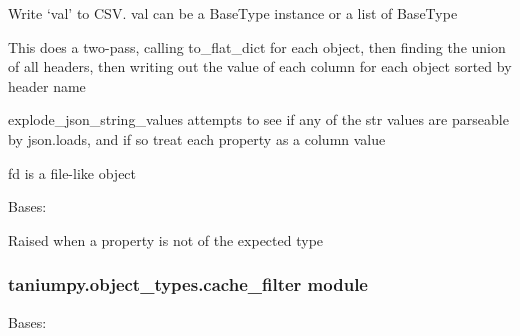 \documentclass[letterpaper,10pt,english]{sphinxmanual}
\begin{document}
\begin{fulllineitems}

\begin{fulllineitems}
\label{taniumpy.object_types:taniumpy.object_types.base.BaseType.write_csv}
Write `val' to CSV. val can be a BaseType instance or a list of
BaseType

This does a two-pass, calling to\_flat\_dict for each object, then
finding the union of all headers,
then writing out the value of each column for each object
sorted by header name

explode\_json\_string\_values attempts to see if any of the str values
are parseable by json.loads, and if so treat each property as a column
value

fd is a file-like object

\end{fulllineitems}


\end{fulllineitems}


\begin{fulllineitems}
\label{taniumpy.object_types:taniumpy.object_types.base.IncorrectTypeException}
Bases: \href{http://docs.python.org/2.7/library/exceptions.html\#exceptions.Exception}{}

Raised when a property is not of the expected type

\end{fulllineitems}



\subsubsection{taniumpy.object\_types.cache\_filter module}
\label{taniumpy.object_types:taniumpy-object-types-cache-filter-module}\label{taniumpy.object_types:module-taniumpy.object_types.cache_filter}

\begin{fulllineitems}
\label{taniumpy.object_types:taniumpy.object_types.cache_filter.CacheFilter}
Bases: {\hyperref[taniumpy.object_types:taniumpy.object_types.base.BaseType]{}}

\end{fulllineitems}
\end{document}

